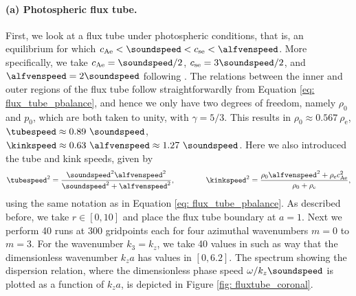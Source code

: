 \paragraph{(a) Photospheric flux tube.}
First, we look at a flux tube under photospheric conditions, that is, an equilibrium for which $c_\text{Ae} < \soundspeed < c_\text{se} < \alfvenspeed$. More specifically, we take $c_\text{Ae} = \soundspeed/2$, $c_\text{se} = 3\soundspeed / 2$, and $\alfvenspeed = 2\soundspeed$ following \citet[Figure 6.5]{book_roberts}. The relations between the inner and outer regions of the flux tube follow straightforwardly from Equation \eqref{eq: flux_tube_pbalance}, and hence we only have two degrees of freedom, namely $\rho_0$ and $p_0$, which are both taken to unity, with $\gamma = 5/3$. This results in $\rho_0 \approx 0.567~\rho_\text{e}$, $\tubespeed \approx 0.89~\soundspeed$,
$\kinkspeed \approx 0.63~\alfvenspeed \approx 1.27~\soundspeed$. Here we also introduced the tube and kink speeds, given by
\begin{equation}
  \tubespeed^2 = \frac{\soundspeed^2 \alfvenspeed^2}{\soundspeed^2 + \alfvenspeed^2}, \qquad\qquad
  \kinkspeed^2 = \frac{\rho_0 \alfvenspeed^2 + \rho_\text{e}c_\text{Ae}^2}{\rho_0 + \rho_\text{e}},
\end{equation}
using the same notation as in Equation \eqref{eq: flux_tube_pbalance}. As described before, we take $r \in [0, 10]$ and place the flux tube boundary at $a = 1$. Next we perform 40 runs at 300 gridpoints each for four azimuthal wavenumbers $m = 0$ to $m = 3$. For the wavenumber $k_3 = k_z$, we take 40 values in such as way that the dimensionless wavenumber $k_z a$ has values in $[0, 6.2]$. The spectrum showing the dispersion relation, where the dimensionless phase speed $\omega / k_z \soundspeed$ is plotted as a function of $k_z a$, is depicted in Figure \ref{fig: fluxtube_coronal}.

